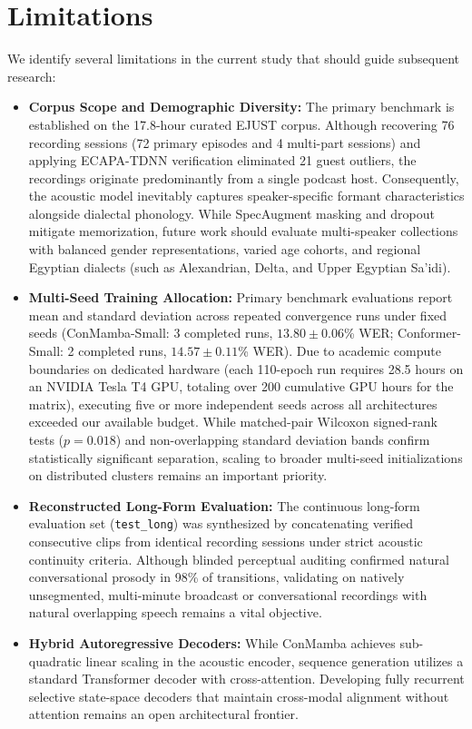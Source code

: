 \documentclass[journal]{IEEEtran}
\begin{document}
\section{Limitations}
\label{sec:limitations}
We identify several limitations in the current study that should guide subsequent research:
\begin{itemize}
\setlength{\itemsep}{1.5pt}
\setlength{\parskip}{0pt}
\setlength{\parsep}{0pt}
    \item \textbf{Corpus Scope and Demographic Diversity:} The primary benchmark is established on the 17.8-hour curated EJUST corpus. Although recovering 76 recording sessions (72 primary episodes and 4 multi-part sessions) and applying ECAPA-TDNN verification eliminated 21 guest outliers, the recordings originate predominantly from a single podcast host. Consequently, the acoustic model inevitably captures speaker-specific formant characteristics alongside dialectal phonology. While SpecAugment masking and dropout mitigate memorization, future work should evaluate multi-speaker collections with balanced gender representations, varied age cohorts, and regional Egyptian dialects (such as Alexandrian, Delta, and Upper Egyptian Sa'idi).
    \item \textbf{Multi-Seed Training Allocation:} Primary benchmark evaluations report mean and standard deviation across repeated convergence runs under fixed seeds (ConMamba-Small: 3 completed runs, $13.80 \pm 0.06$\% WER; Conformer-Small: 2 completed runs, $14.57 \pm 0.11$\% WER). Due to academic compute boundaries on dedicated hardware (each 110-epoch run requires 28.5 hours on an NVIDIA Tesla T4 GPU, totaling over 200 cumulative GPU hours for the matrix), executing five or more independent seeds across all architectures exceeded our available budget. While matched-pair Wilcoxon signed-rank tests ($p = 0.018$) and non-overlapping standard deviation bands confirm statistically significant separation, scaling to broader multi-seed initializations on distributed clusters remains an important priority.
    \item \textbf{Reconstructed Long-Form Evaluation:} The continuous long-form evaluation set (\texttt{test\_long}) was synthesized by concatenating verified consecutive clips from identical recording sessions under strict acoustic continuity criteria. Although blinded perceptual auditing confirmed natural conversational prosody in 98\% of transitions, validating on natively unsegmented, multi-minute broadcast or conversational recordings with natural overlapping speech remains a vital objective.
    \item \textbf{Hybrid Autoregressive Decoders:} While ConMamba achieves sub-quadratic linear scaling in the acoustic encoder, sequence generation utilizes a standard Transformer decoder with cross-attention. Developing fully recurrent selective state-space decoders that maintain cross-modal alignment without attention remains an open architectural frontier.
\end{itemize}
\end{document}

